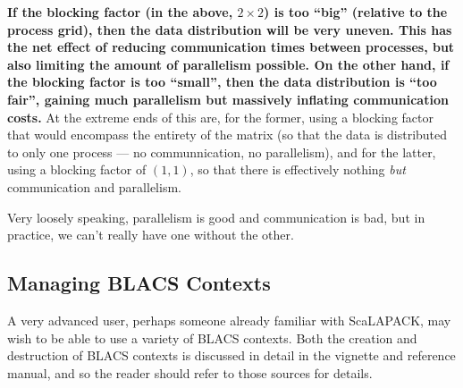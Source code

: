 \textbf{If the blocking factor (in the above, $2\times 2$) is too ``big'' (relative to the process grid), then the data distribution will be very uneven.  This has the net effect of reducing communication times between processes, but also limiting the amount of parallelism possible.  On the other hand, if the blocking factor is too ``small'', then the data distribution is ``too fair'', gaining much parallelism but massively inflating communication costs.}  At the extreme ends of this are, for the former, using a blocking factor that would encompass the entirety of the matrix (so that the data is distributed to only one process --- no communnication, no parallelism), and for the latter, using a blocking factor of $(1,1)$, so that there is effectively nothing \emph{but} communication and parallelism.

Very loosely speaking, parallelism is good and communication is bad, but in practice, we can't really have one without the other.




\subsection{Managing BLACS Contexts}
\label{sec:ictxt}

A very advanced user, perhaps someone already familiar with ScaLAPACK, may wish to be able to use a variety of BLACS contexts.  Both the creation and destruction of BLACS contexts is discussed in detail in the  vignette and reference manual, and so the reader should refer to those sources for details.
